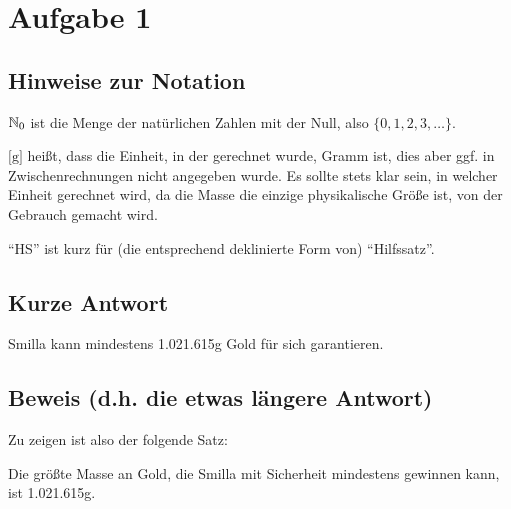 \fancyhead[L]{\leftmark}

\section{Aufgabe 1}

\subsection*{Hinweise zur Notation}

$\mathbb{N}_0$ ist die Menge der natürlichen Zahlen mit der Null, also $\{ 0, 1, 2, 3, \ldots \}$.

$\text{[g]}$ heißt, dass die Einheit, in der gerechnet wurde, Gramm ist, dies aber ggf. in Zwischenrechnungen nicht 
angegeben wurde. Es sollte stets klar sein, in welcher Einheit gerechnet wird, da die Masse die einzige physikalische 
Größe ist, von der Gebrauch gemacht wird.

"`HS"' ist kurz für (die entsprechend deklinierte Form von) "`Hilfssatz"'.

\subsection*{Kurze Antwort}

Smilla kann mindestens 1.021.615g Gold für sich garantieren.

\subsection*{Beweis (d.h. die etwas längere Antwort)}

Zu zeigen ist also der folgende Satz:
\begin{thm}
    Die größte Masse an Gold, die Smilla mit Sicherheit mindestens gewinnen kann, ist 1.021.615g.
\end{thm}

